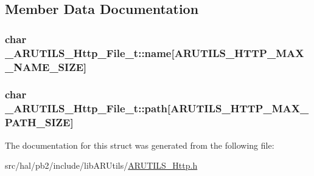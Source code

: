 \subsection{Member Data Documentation}
\subsubsection[{\texorpdfstring{name}{name}}]{\setlength{\rightskip}{0pt plus 5cm}char \+\_\+\+A\+R\+U\+T\+I\+L\+S\+\_\+\+Http\+\_\+\+File\+\_\+t\+::name\mbox{[}{\bf A\+R\+U\+T\+I\+L\+S\+\_\+\+H\+T\+T\+P\+\_\+\+M\+A\+X\+\_\+\+N\+A\+M\+E\+\_\+\+S\+I\+ZE}\mbox{]}}\hypertarget{struct___a_r_u_t_i_l_s___http___file__t_a497afd15aa4d10b698314d226a03ac4e}{}\label{struct___a_r_u_t_i_l_s___http___file__t_a497afd15aa4d10b698314d226a03ac4e}
\subsubsection[{\texorpdfstring{path}{path}}]{\setlength{\rightskip}{0pt plus 5cm}char \+\_\+\+A\+R\+U\+T\+I\+L\+S\+\_\+\+Http\+\_\+\+File\+\_\+t\+::path\mbox{[}{\bf A\+R\+U\+T\+I\+L\+S\+\_\+\+H\+T\+T\+P\+\_\+\+M\+A\+X\+\_\+\+P\+A\+T\+H\+\_\+\+S\+I\+ZE}\mbox{]}}\hypertarget{struct___a_r_u_t_i_l_s___http___file__t_a79111cf110b0280ecb3ab027d4a00b5e}{}\label{struct___a_r_u_t_i_l_s___http___file__t_a79111cf110b0280ecb3ab027d4a00b5e}


The documentation for this struct was generated from the following file\+:\begin{DoxyCompactItemize}
\item 
src/hal/pb2/include/lib\+A\+R\+Utils/\hyperlink{_a_r_u_t_i_l_s___http_8h}{A\+R\+U\+T\+I\+L\+S\+\_\+\+Http.\+h}\end{DoxyCompactItemize}
